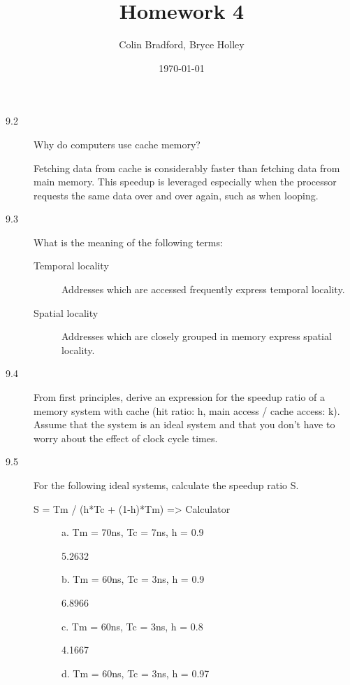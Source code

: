 \documentclass[letterpaper,10pt,titlepage]{article}
\def\name{Colin Bradford, Bryce Holley}
\begin{document}
\title{Homework 4}
\author{\name}
\date{\today}
\maketitle
\begin{description}
    \item[9.2] Why do computers use cache memory?
    
    Fetching data from cache is considerably faster than fetching data from main memory. This speedup is leveraged especially when the processor requests the same data over and over again, such as when looping.
    \item[9.3] What is the meaning of the following terms:
    \begin{description}
        \item[Temporal locality]
        
        Addresses which are accessed frequently express temporal locality.
        \item[Spatial locality]
        
        Addresses which are closely grouped in memory express spatial locality.
    \end{description}
    \item[9.4] From first principles, derive an expression for the speedup ratio of a memory system with cache (hit ratio: h, main access / cache access: k). Assume that the system is an ideal system and that you don't have to worry about the effect of clock cycle times.
    
    \item[9.5] For the following ideal systems, calculate the speedup ratio S.
    
    S =  Tm / (h*Tc + (1-h)*Tm) => Calculator
    \begin{description}
        \item[] a. Tm = 70ns, Tc = 7ns, h = 0.9
        
        5.2632
        \item[] b. Tm = 60ns, Tc = 3ns, h = 0.9
        
        6.8966
        \item[] c. Tm = 60ns, Tc = 3ns, h = 0.8
        
        4.1667
        \item[] d. Tm = 60ns, Tc = 3ns, h = 0.97
        

\end{description}
\end{description}
\end{document}
